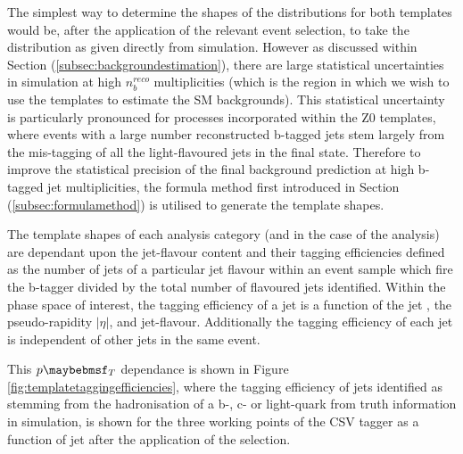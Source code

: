 The simplest way to determine the shapes of the \nbreco distributions for both templates would be, after the application of the relevant event selection, to take the \nbreco distribution as given directly from simulation. However as discussed within Section (\ref{subsec:backgroundestimation}), there are large statistical uncertainties in simulation at high $n_{b}^{reco}$ multiplicities (which is the region in which we wish to use the templates to estimate the \ac{SM} backgrounds). This statistical uncertainty is particularly pronounced for processes incorporated within the Z0 templates, where events with a large number reconstructed b-tagged jets stem largely from the mis-tagging of all the light-flavoured jets in the final state. Therefore to improve the statistical precision of the final background prediction at high b-tagged jet multiplicities, the formula method first introduced in Section (\ref{subsec:formulamethod}) is utilised to generate the template shapes. 

The template shapes of each analysis category (\theht and \njet in the case of the \alphat analysis) are dependant upon the jet-flavour content and their tagging efficiencies defined as the number of jets of a particular jet flavour within an event sample which fire the b-tagger divided by the total number of flavoured jets identified. Within the phase space of interest, the tagging efficiency of a jet is a function of the jet \pt, the pseudo-rapidity $\rvert\eta\lvert$, and jet-flavour. Additionally the tagging efficiency of each jet is independent of other jets in the same event.

This $\pt$ dependance is shown in Figure \ref{fig:templatetaggingefficiencies}, where the tagging efficiency of jets identified as stemming from the hadronisation of a b-, c- or light-quark from truth information in simulation, is shown for the three working points of the \ac{CSV} tagger as a function of jet \pt after the application of the \alphat \mupjets selection. 

